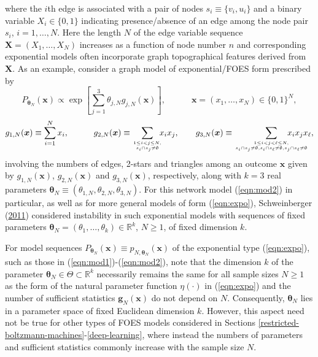 \documentclass[12pt]{article}
\theoremstyle{definition}
\begin{document}
 where the $i$th edge is associated with a pair of nodes $s_i \equiv \{v_i,u_i\}$  and a binary variable $X_i\in\{0,1\}$  indicating   presence/absence of an edge among the   node pair $s_i$, $i=1,\ldots,N$.  Here the length $N$ of the edge variable sequence $\boldsymbol X =(X_1,\ldots,X_N)$ increases as a function of node number $n$ and corresponding
 exponential models often incorporate graph topographical features derived from $\boldsymbol X$. As an example,  consider a   graph model of exponential/FOES form prescribed by
 \begin{equation}
\label{eqn:mod2} P_{\boldsymbol \theta_N}(\boldsymbol x) \propto
 \exp\left[\sum_{j=1}^3 \theta_{j,N} g_{j,N}(\boldsymbol x)\right], \quad\qquad \boldsymbol x=(x_1,\ldots,x_N)  \in\{0,1\}^N,\end{equation}
  \[
  g_{1,N}(\boldsymbol x) \equiv \sum_{i=1}^N  x_i, \qquad\quad g_{2,N}(\boldsymbol x) \equiv \sum_{1 \leq i<j \leq N,\atop s_i \cap s_j \neq \emptyset}\!\!\!   x_i x_j, \qquad
  g_{3,N}(\boldsymbol x) \equiv \sum_{1 \leq i<j<\ell \leq N, \atop s_i \cap s_j \neq \emptyset,s_i \cap s_\ell \neq \emptyset, \\ s_j \cap s_\ell \neq \emptyset } \!\!\!\!\!\!\!\!  \!\!\!\!\!\!\!\!   x_i x_j x_\ell,
  \]
 involving the numbers of edges, 2-stars and triangles among an outcome $\boldsymbol x$ given by   $ g_{1,N}(\boldsymbol x)$,   $ g_{2,N}(\boldsymbol x)$  and  $ g_{3,N}(\boldsymbol x)$, respectively, along   with $k=3$ real parameters $\boldsymbol \theta_N \equiv (\theta_{1,N},\theta_{2,N},\theta_{3,N})$.   For this network model (\ref{eqn:mod2}) in particular, as well as for more general models of form (\ref{eqn:expo}),  Schweinberger
(\protect\hyperlink{ref-schweinberger2011instability}{2011}) considered instability in such exponential models   with sequences of fixed parameters $\boldsymbol \theta_N= (\theta_1,\ldots,\theta_k)\in\mathbb{R}^k$, $N \geq 1$, of fixed dimension $k$.


  For model sequences $P_{\boldsymbol \theta_N}(\boldsymbol x)\equiv p_{N,\boldsymbol \theta_N}(\boldsymbol x)$
  of the exponential type (\ref{eqn:expo}), such as those in (\ref{eqn:mod1})-(\ref{eqn:mod2}),
   note that the dimension $k$ of the parameter $\boldsymbol \theta_N\in\Theta \subset \mathbb{R}^k$  necessarily remains the same for all sample sizes $N \geq 1$ as the form of the natural parameter function $\eta(\cdot)$ in (\ref{eqn:expo}) and the number of sufficient statistics $\boldsymbol g_{N}(\boldsymbol x)$ do not depend on $N$.  Consequently,
   $\boldsymbol \theta_N$ lies in a parameter space of fixed Euclidean dimension $k$.  However, this aspect need not be true for other types of FOES models considered in Sections \ref{restricted-boltzmann-machines}-\ref{deep-learning}, where instead the numbers of parameters and sufficient statistics commonly increase with the sample size $N$.
\end{document}

